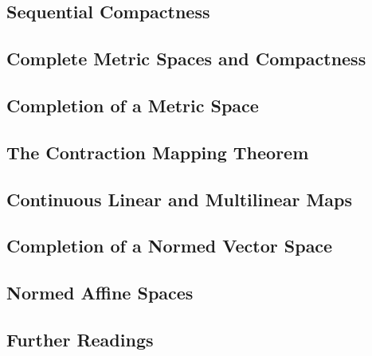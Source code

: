 \documentclass[a4paper]{article}
\begin{document}
\subsection{ Sequential Compactness} %

\subsection{ Complete Metric Spaces and Compactness} %

\subsection{ Completion of a Metric Space} %

\subsection{ The Contraction Mapping Theorem} %

\subsection{ Continuous Linear and Multilinear Maps} %

\subsection{ Completion of a Normed Vector Space} %

\subsection{ Normed Affine Spaces} %

\subsection{ Further Readings} %
\end{document}
